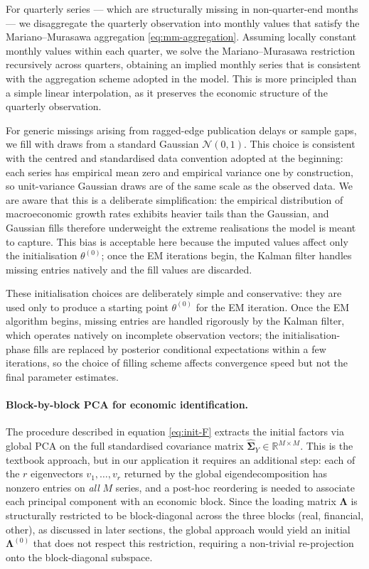 \documentclass[11pt, a4paper, oneside]{article}
\begin{document}
For quarterly series — which are structurally missing in non-quarter-end 
months — we disaggregate the quarterly observation into monthly 
values that satisfy the Mariano–Murasawa aggregation 
\eqref{eq:mm-aggregation}. Assuming locally constant monthly values 
within each quarter, we solve the Mariano–Murasawa restriction 
recursively across quarters, obtaining an implied monthly series 
that is consistent with the aggregation scheme adopted in the model. 
This is more principled than a simple linear interpolation, as it 
preserves the economic structure of the quarterly observation.

For generic missings arising from ragged-edge publication delays or
sample gaps, we fill with draws from a standard Gaussian
$\mathcal{N}(0, 1)$. This choice is consistent with the centred and
standardised data convention adopted at the beginning: each series
has empirical mean zero and empirical variance one by construction,
so unit-variance Gaussian draws are of the same scale as the observed
data. We are aware that this is a deliberate simplification: the
empirical distribution of macroeconomic growth rates exhibits heavier
tails than the Gaussian, and Gaussian fills therefore underweight the
extreme realisations the model is meant to capture. This bias is
acceptable here because the imputed values affect only the
initialisation $\theta^{(0)}$; once the EM iterations begin, the
Kalman filter handles missing entries natively and the fill values
are discarded.

These initialisation choices are deliberately simple and 
conservative: they are used only to produce a starting point 
$\theta^{(0)}$ for the EM iteration. Once the EM algorithm begins, 
missing entries are handled rigorously by the Kalman filter, which 
operates natively on incomplete observation vectors; the 
initialisation-phase fills are replaced by posterior conditional 
expectations within a few iterations, so the choice of filling 
scheme affects convergence speed but not the final parameter 
estimates.

\paragraph{Block-by-block PCA for economic identification.}
The procedure described in equation \eqref{eq:init-F} extracts the
initial factors via global PCA on the full standardised covariance
matrix $\widehat{\boldsymbol{\Sigma}}_Y \in \mathbb{R}^{M \times M}$.
This is the textbook approach, but in our application it requires
an additional step: each of the $r$ eigenvectors $v_1, \ldots, v_r$
returned by the global eigendecomposition has nonzero entries on
\emph{all} $M$ series, and a post-hoc reordering is needed to
associate each principal component with an economic block. Since
the loading matrix $\boldsymbol{\Lambda}$ is structurally restricted
to be block-diagonal across the three blocks (real, financial, other),
as discussed in later sections, the global
approach would yield an initial $\boldsymbol{\Lambda}^{(0)}$ that
does not respect this restriction, requiring a non-trivial
re-projection onto the block-diagonal subspace.
\end{document}
